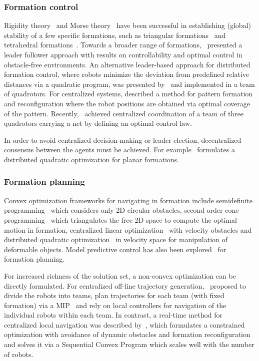 \subsubsection{Formation control}
Rigidity theory~\cite{Eren.Belhumeur.ea:02} and Morse theory~\cite{Anderson:11} have been successful in establishing (global) stability of a few specific formations, such as triangular formations~\cite{Cao.Morse.ea:11} and tetrahedral formations~\cite{Anderson.Yu.ea:10}.
Towards a broader range of formations,~\cite{Ji:2006tr} presented a leader follower approach with results on controllability and optimal control in obstacle-free environments. An alternative leader-based approach for distributed formation control, where robots minimize the deviation from predefined relative distances via a quadratic program, was presented by~\cite{Turpin:2012uh} and implemented in a team of quadrotors.
For centralized systems, \cite{alonsomora12ijrr} described a method for pattern formation and reconfiguration where the robot positions are obtained via optimal coverage of the pattern. Recently,~\cite{Ritz:uc} achieved centralized coordination of a team of three quadrotors carrying a net by defining an optimal control law.

In order to avoid centralized decision-making or leader election, decentralized consensus between the agents must be achieved. For example~\cite{Montijano:2014bn} formulates a distributed quadratic optimization for planar formations.

\subsubsection{Formation planning}
Convex optimization frameworks for navigating in formation include semidefinite programming~\cite{Derenick:2010cc} which considers only 2D circular obstacles, second order cone programming~\cite{Derenick:ha} which triangulates the free 2D space to compute the optimal motion in formation, centralized linear optimization~\cite{Karamouzas:wm} with velocity obstacles and distributed quadratic optimization~\cite{AlonsoMora:2015wi} in velocity space for manipulation of deformable objects. Model predictive control has also been explored~\cite{Dunbar:2002fh} for formation planning.

For increased richness of the solution set, a non-convex optimization can be directly formulated. For centralized off-line trajectory generation,~\cite{Kushleyev:2012wy} proposed to divide the robots into teams, plan trajectories for each team (with fixed formation) via a MIP~\cite{Mellinger:2012fi} and rely on local controllers for navigation of the individual robots within each team.
In contrast, a real-time method for centralized local navigation was described by~\cite{alonsomora15iros}, which formulates a constrained optimization with avoidance of dynamic obstacles and formation reconfiguration and solves it via a Sequential Convex Program which scales well with the number of robots.










